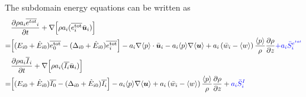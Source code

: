 \documentclass{report}
\begin{document}
The subdomain energy equations can be written as 
\begin{align*}
&\frac{\partial \rho a_i \overline{e^{tot}}_i}{\partial t} 
 + \nabla\Big[\rho a_i(\overline{e_i^\mathrm{tot}} \bar{\vec{u}}_i)\Big] \\
 =& \Big[(E_{i0} + \hat{E}_{i0}) \overline{e_0^\mathrm{tot}}  - (\Delta_{i0} + \hat{E}_{i0}) \overline{e_i^\mathrm{tot}} \Big]   -  a_i  \nabla\langle p \rangle  \cdot \bar{\vec{u}}_i   - a_i \langle p\rangle \nabla \langle\vec{u}\rangle + a_i\left(\bar{w}_i - \langle w \rangle\right) \frac{\langle p\rangle}{\rho}\frac{\partial \rho}{\partial z} {\color{blue}+ a_i \bar{S}^{e^{tot}}_i}\\
 &\frac{\partial \rho a_i \overline{I}_i}{\partial t} 
 + \nabla\Big[\rho a_i(\overline{I_i} \bar{\vec{u}}_i)\Big] \\
 =& \Big[(E_{i0} + \hat{E}_{i0}) \overline{I_0}  - (\Delta_{i0} + \hat{E}_{i0}) \overline{I_i} \Big] - a_i \langle p\rangle \nabla \langle\vec{u}\rangle + a_i\left(\bar{w}_i - \langle w \rangle\right) \frac{\langle p\rangle}{\rho}\frac{\partial \rho}{\partial z} + {\color{blue}a_i \bar{S}^{I}_i}\\
\end{align*}
\end{document}
